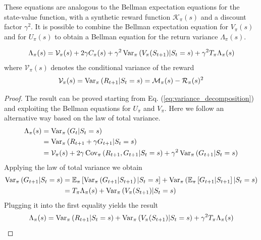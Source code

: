 These equations are analogous to the Bellman expectation equations for the state-value function, with a synthetic reward function $\mathcal{K}_\pi(s)$ and a discount factor $\gamma^2$. It is possible to combine the Bellman expectation equation for $V_\pi(s)$ and for $U_\pi(s)$ to obtain a Bellman equation for the return variance $\Lambda_\pi(s)$.
\begin{proposition}
	\begin{equation}
			\Lambda_\pi(s) = \mathcal{V}_\pi(s) + 2 \gamma C_\pi(s) + \gamma^2 \Var[\pi]{V_\pi(S_{t+1}) | S_t = s} + \gamma^2 T_\pi \Lambda_\pi(s)	
	\end{equation}
	where $\mathcal{V}_\pi(s)$ denotes the conditional variance of the reward
	\begin{equation}
		\mathcal{V}_\pi(s) = \Var[\pi]{R_{t+1} | S_t = s} = \calM_\pi(s) - \calR_\pi(s)^2
	\end{equation}
\end{proposition}
\begin{proof}
The result can be proved starting from Eq. (\ref{eq:variance_decomposition}) and exploiting the Bellman equations for $U_\pi$ and $V_\pi$. Here we follow an alternative way based on the law of total variance.
\begin{equation*}
\begin{split}
		\Lambda_\pi(s) &= \Var[\pi]{G_t | S_t = s}\\
					   &= \Var[\pi]{R_{t+1} + \gamma G_{t+1} | S_t = s}\\
					   &= \mathcal{V}_\pi(s) + 2 \gamma \Cov[\pi]{R_{t+1}, G_{t+1} | S_t = s} + \gamma^2 \Var[\pi]{G_{t+1} | S_t = s}\\
\end{split}
\end{equation*}
Applying the law of total variance we obtain
\begin{equation*}
	\begin{split}
	\Var[\pi]{G_{t+1} | S_t = s} &= \E[\pi]{ \Var[\pi]{G_{t+1} | S_{t+1}} | S_t = s} + \Var[\pi]{\E[\pi]{G_{t+1} | S_{t+1}} | S_t = s}\\
	&= T_\pi \Lambda_\pi(s) + \Var[\pi]{V_\pi(S_{t+1}) | S_t = s}
	\end{split}
\end{equation*}
Plugging it into the first equality yields the result
\begin{equation*}
	\Lambda_\pi(s) = \Var[\pi]{R_{t+1} | S_t = s} + \Var[\pi]{V_\pi(S_{t+1}) | S_t = s} + \gamma^2 T_\pi \Lambda_\pi(s)
\end{equation*}
\end{proof}
